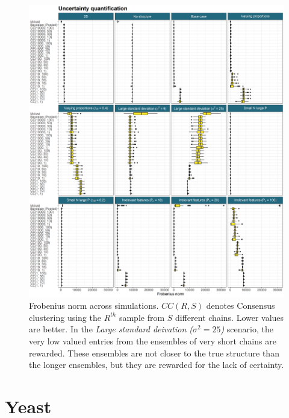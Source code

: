 \documentclass[]{article}
\begin{document}
\begin{figure} %
	\centering
	\includegraphics[scale=0.4]{./Images/Simulations/simulation_uncertainty.png}
	\caption{Frobenius norm across simulations. $CC(R, S)$ denotes Consensus clustering using the $R^{th}$ sample from $S$ different chains. Lower values are better. In the \emph{Large standard deivation ($\sigma^2 = 25$)} scenario, the very low valued entries from the ensembles of very short chains are rewarded. These ensembles are not closer to the true structure than the longer ensembles, but they are rewarded for the lack of certainty.}
	\label{fig:simUncertainty}
\end{figure}

\section{Yeast} \label{sec:yeast}

\end{document}
